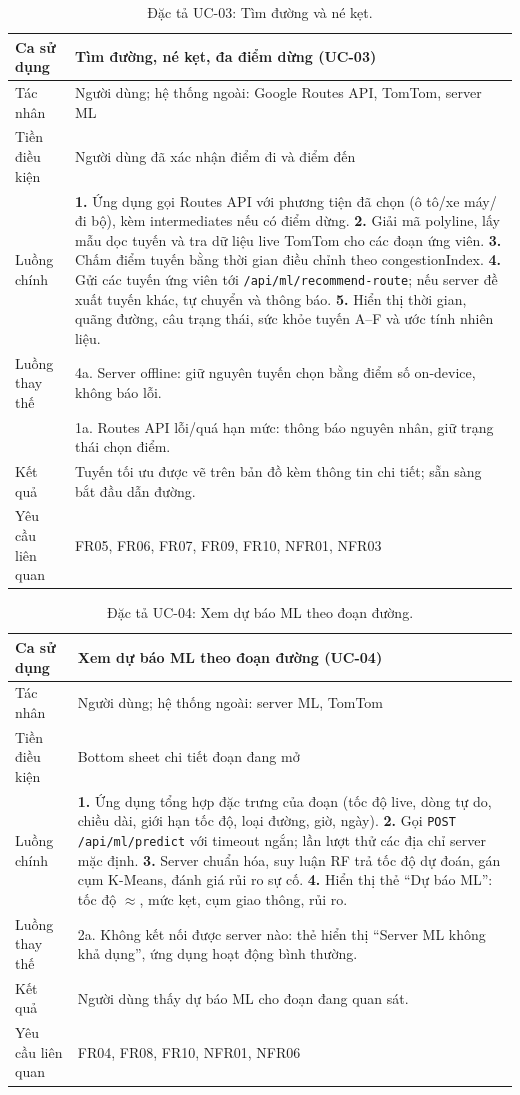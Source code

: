 \begin{table}[h!]
\centering
\caption{Đặc tả UC-03: Tìm đường và né kẹt.}
\label{tab:uc3}
\small
\begin{tabularx}{\textwidth}{lX}
\toprule
\textbf{Ca sử dụng} & Tìm đường, né kẹt, đa điểm dừng (UC-03)\\
\midrule
Tác nhân & Người dùng; hệ thống ngoài: Google Routes API, TomTom, server ML\\
Tiền điều kiện & Người dùng đã xác nhận điểm đi và điểm đến\\
Luồng chính & \textbf{1.} Ứng dụng gọi Routes API với phương tiện đã chọn (ô tô/xe máy/đi bộ), kèm intermediates nếu có điểm dừng. \textbf{2.} Giải mã polyline, lấy mẫu dọc tuyến và tra dữ liệu live TomTom cho các đoạn ứng viên. \textbf{3.} Chấm điểm tuyến bằng thời gian điều chỉnh theo congestionIndex. \textbf{4.} Gửi các tuyến ứng viên tới \texttt{/api/ml/recommend-route}; nếu server đề xuất tuyến khác, tự chuyển và thông báo. \textbf{5.} Hiển thị thời gian, quãng đường, câu trạng thái, sức khỏe tuyến A--F và ước tính nhiên liệu.\\
Luồng thay thế & 4a. Server offline: giữ nguyên tuyến chọn bằng điểm số on-device, không báo lỗi.\\
 & 1a. Routes API lỗi/quá hạn mức: thông báo nguyên nhân, giữ trạng thái chọn điểm.\\
Kết quả & Tuyến tối ưu được vẽ trên bản đồ kèm thông tin chi tiết; sẵn sàng bắt đầu dẫn đường.\\
Yêu cầu liên quan & FR05, FR06, FR07, FR09, FR10, NFR01, NFR03\\
\bottomrule
\end{tabularx}
\end{table}

\begin{table}[h!]
\centering
\caption{Đặc tả UC-04: Xem dự báo ML theo đoạn đường.}
\label{tab:uc4}
\small
\begin{tabularx}{\textwidth}{lX}
\toprule
\textbf{Ca sử dụng} & Xem dự báo ML theo đoạn đường (UC-04)\\
\midrule
Tác nhân & Người dùng; hệ thống ngoài: server ML, TomTom\\
Tiền điều kiện & Bottom sheet chi tiết đoạn đang mở\\
Luồng chính & \textbf{1.} Ứng dụng tổng hợp đặc trưng của đoạn (tốc độ live, dòng tự do, chiều dài, giới hạn tốc độ, loại đường, giờ, ngày). \textbf{2.} Gọi \texttt{POST /api/ml/predict} với timeout ngắn; lần lượt thử các địa chỉ server mặc định. \textbf{3.} Server chuẩn hóa, suy luận RF trả tốc độ dự đoán, gán cụm K-Means, đánh giá rủi ro sự cố. \textbf{4.} Hiển thị thẻ ``Dự báo ML'': tốc độ $\approx$, mức kẹt, cụm giao thông, rủi ro.\\
Luồng thay thế & 2a. Không kết nối được server nào: thẻ hiển thị ``Server ML không khả dụng'', ứng dụng hoạt động bình thường.\\
Kết quả & Người dùng thấy dự báo ML cho đoạn đang quan sát.\\
Yêu cầu liên quan & FR04, FR08, FR10, NFR01, NFR06\\
\bottomrule
\end{tabularx}
\end{table}


